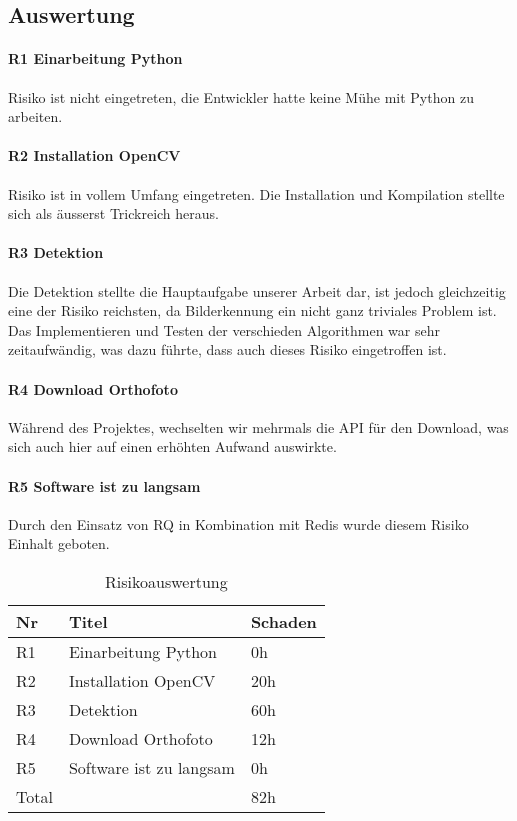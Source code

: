 \subsection{Auswertung}
\paragraph{R1	Einarbeitung Python}
Risiko ist nicht eingetreten, die Entwickler hatte keine Mühe mit Python zu arbeiten.

\paragraph{R2 Installation OpenCV}
Risiko ist in vollem Umfang eingetreten. Die Installation und Kompilation stellte sich als äusserst Trickreich heraus.

\paragraph{R3 Detektion}
Die Detektion stellte die Hauptaufgabe unserer Arbeit dar, ist jedoch gleichzeitig eine der Risiko reichsten, da Bilderkennung ein nicht ganz triviales Problem ist. Das Implementieren und Testen der verschieden Algorithmen war sehr zeitaufwändig, was dazu führte, dass auch dieses Risiko eingetroffen ist.

\paragraph{R4 Download Orthofoto}
Während des Projektes, wechselten wir mehrmals die API für den Download, was sich auch hier auf einen erhöhten Aufwand auswirkte. 

\paragraph{R5 Software ist zu langsam}
Durch den Einsatz von RQ in Kombination mit Redis wurde diesem Risiko Einhalt geboten. \\

\begin{table}[H]
	\centering
    \begin{tabular}{|p{2cm}|p{5cm}|p{2cm}|}
    \hline    
    \rowcolor{lightblue}
	Nr & Titel & Schaden \\ \hline   
	R1 & Einarbeitung Python & 0h \\ \hline
	R2 & Installation OpenCV & 20h \\ \hline
	R3 & Detektion & 60h \\ \hline
	R4 & Download Orthofoto & 12h \\ \hline
	R5 & Software ist zu langsam & 0h \\ \hline
	\rowcolor{lightblue}
	Total &  & 82h \\ \hline
    \end{tabular}
    \caption[Risikoauswertung]{Risikoauswertung}
\end{table}